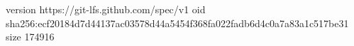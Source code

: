 version https://git-lfs.github.com/spec/v1
oid sha256:ecf20184d7d44137ac03578d44a5454f368fa022fadb6d4c0a7a83a1c517be31
size 174916
